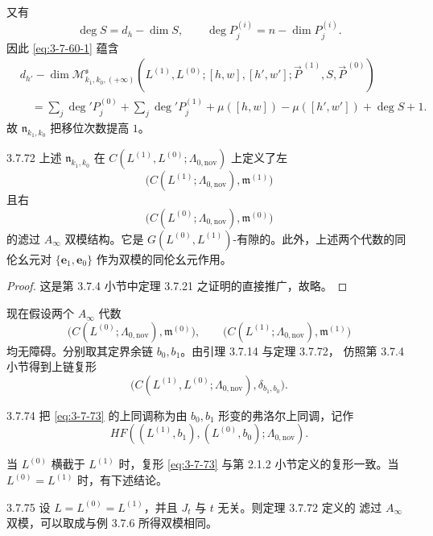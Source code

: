 又有
\[
 \deg S=d_h-\dim S,\qquad
 \deg P_j^{(i)}=n-\dim P_j^{(i)}.
\]
因此 \eqref{eq:3-7-60-1} 蕴含
\[
\begin{aligned}
 &d_{h'}-\dim
 \mathcal M^{\mathfrak s}_{k_1,k_0,(+\infty)}
 (L^{(1)},L^{(0)};[h,w],[h',w'];
 \vec P^{\,(1)},S,\vec P^{\,(0)})\\
 &\quad=
 \sum_j\deg'P_j^{(0)}
 +\sum_j\deg'P_j^{(1)}
 +\mu([h,w])-\mu([h',w'])+\deg S+1.
\end{aligned}
\]
故 $\mathfrak n_{k_1,k_0}$ 把移位次数提高 $1$。

\begin{theorem}{3.7.72}\label{thm:3-7-72}
上述 $\mathfrak n_{k_1,k_0}$ 在
$C(L^{(1)},L^{(0)};\Lambda_{0,\mathrm{nov}})$ 上定义了左
\[
 \bigl(C(L^{(1)};\Lambda_{0,\mathrm{nov}}),\mathfrak m^{(1)}\bigr)
\]
且右
\[
 \bigl(C(L^{(0)};\Lambda_{0,\mathrm{nov}}),\mathfrak m^{(0)}\bigr)
\]
的滤过 $A_\infty$ 双模结构。它是
$G(L^{(0)},L^{(1)})$-有隙的。此外，上述两个代数的同伦幺元对
$\{\mathbf e_1,\mathbf e_0\}$ 作为双模的同伦幺元作用。
\end{theorem}

\begin{proof}
这是第 3.7.4 小节中定理 3.7.21 之证明的直接推广，故略。
\end{proof}

现在假设两个 $A_\infty$ 代数
\[
 \bigl(C(L^{(0)};\Lambda_{0,\mathrm{nov}}),\mathfrak m^{(0)}\bigr),
 \qquad
 \bigl(C(L^{(1)};\Lambda_{0,\mathrm{nov}}),\mathfrak m^{(1)}\bigr)
\]
均无障碍。分别取其定界余链 $b_0,b_1$。由引理 3.7.14 与定理 3.7.72，
仿照第 3.7.4 小节得到上链复形
\begin{equation}
 \bigl(
 C(L^{(1)},L^{(0)};\Lambda_{0,\mathrm{nov}}),
 \delta_{b_1,b_0}
 \bigr).
\tag{3.7.73}\label{eq:3-7-73}
\end{equation}

\begin{definition}{3.7.74}\label{def:3-7-74}
把 \eqref{eq:3-7-73} 的上同调称为由 $b_0,b_1$ 形变的弗洛尔上同调，记作
\[
 HF((L^{(1)},b_1),(L^{(0)},b_0);\Lambda_{0,\mathrm{nov}}).
\]
\end{definition}

当 $L^{(0)}$ 横截于 $L^{(1)}$ 时，复形 \eqref{eq:3-7-73} 与第 2.1.2
小节定义的复形一致。当 $L^{(0)}=L^{(1)}$ 时，有下述结论。

\begin{proposition}{3.7.75}\label{prop:3-7-75}
设 $L=L^{(0)}=L^{(1)}$，并且 $J_t$ 与 $t$ 无关。则定理 3.7.72 定义的
滤过 $A_\infty$ 双模，可以取成与例 3.7.6 所得双模相同。
\end{proposition}

